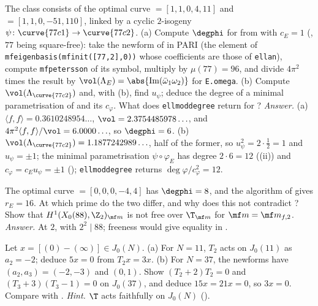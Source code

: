 \begin{exercise}\label{ex:moddeg:ex-77c}
The class  consists of the optimal curve  $=[1,1,0,4,11]$ and  $=[1,1,0,-51,110]$, linked by a cyclic $2$-isogeny $\psi\colon\curve{77c1}\to\curve{77c2}$.
(a) Compute $\degphi$ for  from  with $c_E=1$ (, $77$ being square-free): take the newform of  in PARI (the element of
\texttt{mfeigenbasis(mfinit([77,2],0))} whose coefficients are those of \texttt{ellan}), compute \texttt{mfpetersson} of its symbol, multiply by $\mu(77)=96$, and divide $4\pi^2$ times the result by
$\vol(\Lambda_E)=\abs{\operatorname{Im}(\bar\omega_1\omega_2)}$ for \texttt{E.omega}. (b) Compute $\vol(\Lambda_{\curve{77c2}})$ and, with (b), find $u_\psi$; deduce the degree of a minimal
parametrisation of  and its $c_\varphi$. What does \texttt{ellmoddegree} return for ?
\emph{Answer.} (a) $\langle f,f\rangle=0.3610248954\ldots$, $\vol=2.3754485978\ldots$, and $4\pi^2\langle f,f\rangle/\vol=6.0000\ldots$, so $\degphi=6$. (b) $\vol(\Lambda_{\curve{77c2}})=1.1877242989\ldots$, half of the
former, so $u_\psi^2=2\cdot\frac12=1$ and $u_\psi=\pm1$; the minimal parametrisation $\psi\circ\varphi_E$ has degree $2\cdot6=12$ ((ii)) and $c_\varphi=c_Eu_\psi=\pm1$
(); \texttt{ellmoddegree} returns $\deg\varphi/c_\varphi^2=12$.
\end{exercise}

\begin{exercise}\label{ex:moddeg:ex-88}
The optimal curve  $=[0,0,0,-4,4]$ has $\degphi=8$, and the algorithm of  gives $r_E=16$. At which prime do the two differ, and why does this not contradict
? Show that $H^1(X_0(88),\Z_2)_{\mf m}$ is not free over $\T_{\mf m}$ for $\mf m=\mf m_{f,2}$. \emph{Answer.} At $2$, with $2^2\mid88$; freeness would give equality in
.
\end{exercise}

\begin{exercise}\label{ex:moddeg:ex-md}
Let $x=[(0)-(\infty)]\in J_0(N)$. (a) For $N=11$, $T_2$ acts on $J_0(11)$ as $a_2=-2$; deduce $5x=0$ from $T_2x=3x$. (b) For $N=37$, the newforms have $(a_2,a_3)=(-2,-3)$ and $(0,1)$. Show $(T_2+2)T_2=0$ and
$(T_3+3)(T_3-1)=0$ on $J_0(37)$, and deduce $15x=21x=0$, so $3x=0$. Compare with . \emph{Hint.} $\T$ acts faithfully on $J_0(N)$ ().
\end{exercise}

